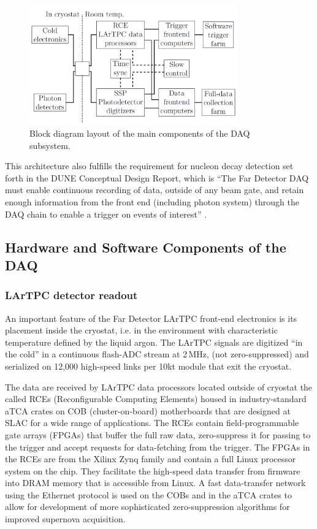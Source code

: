 \begin{figure}[h!]
	\centering
	\includegraphics[width=0.8\textwidth]{daq-block-diagram.png}
	\caption{Block diagram layout of the main components of the DAQ subsystem.}
	\label{fig:fddaqblock}
\end{figure}

\noindent
This architecture also fulfills the requirement for nucleon decay detection set forth in the DUNE Conceptual Design Report,
which is ``The Far Detector DAQ must enable continuous recording of data, outside of any beam gate, and retain enough information from
the front end (including photon system) through the DAQ chain to enable a trigger on events of interest'' \cite{cdr_vol2}.

\subsection{Hardware and Software Components of the DAQ}
\subsubsection{LArTPC detector readout}
An important feature of the Far Detector LArTPC front-end electronics is its placement inside
the cryostat, i.e. in the environment  with characteristic temperature defined by the liquid argon.
The LArTPC signals are digitized ``in the cold'' in a continuous flash-ADC stream at 2\,MHz, (not zero-suppressed)
and serialized on 12,000 high-speed links per 10kt module that exit the cryostat.

The data are received by LArTPC data processors located outside of cryostat the called RCEs \cite{slac_rce_1} (Reconfigurable
Computing Elements) housed in industry-standard aTCA crates on COB (cluster-on-board)
motherboards that are designed at SLAC for a wide range of applications.  The RCEs contain
field-programmable gate arrays (FPGAs) that buffer the full raw data,
zero-suppress it for passing to the trigger and accept requests for
data-fetching from the trigger.  The FPGAs in the RCEs are from the
Xilinx Zynq family and contain a full Linux processor system on the
chip.  They facilitate the high-speed data transfer from firmware into
DRAM memory that is accessible from Linux.  A fast data-transfer
network using the Ethernet protocol is used on the COBs and in the
aTCA crates to allow for development of more sophisticated zero-suppression algorithms
for improved supernova acquisition.

